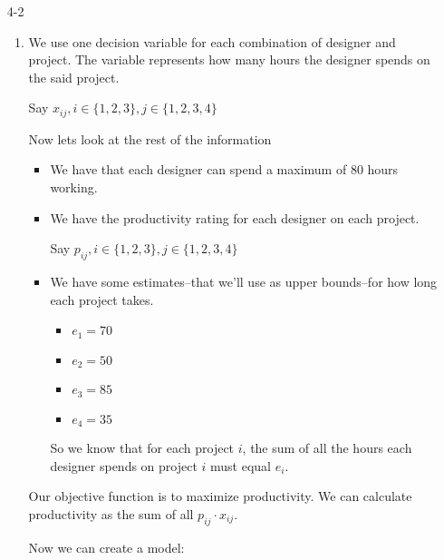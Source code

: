 \documentclass[12pt,letterpaper]{article}
\begin{document}
\begin{enumerate}
    \item [4-2]
      \begin{enumerate}
        \item
          We use one decision variable for each combination of designer and project.
          The variable represents how many hours the designer spends on the said project.

          Say $x_{ij}, i \in \{1, 2, 3\}, j \in \{1, 2, 3, 4\}$

          Now lets look at the rest of the information

          \begin{itemize}
            \item We have that each designer can spend a maximum of 80 hours working.
            \item
              We have the productivity rating for each designer on each project.

              Say $p_{ij}, i \in \{1, 2, 3\}, j \in \{1, 2, 3, 4\}$
            \item
              We have some estimates--that we'll use as upper bounds--for how long each project takes.
              \begin{itemize}
                \item $e_1 = 70$
                \item $e_2 = 50$
                \item $e_3 = 85$
                \item $e_4 = 35$
              \end{itemize}
              So we know that for each project $i$,
              the sum of all the hours each designer spends on project $i$ must equal $e_i$.
          \end{itemize}

          Our objective function is to maximize productivity.
          We can calculate productivity as the sum of all $p_{ij} \cdot x_{ij}$.

          Now we can create a model:


\end{enumerate}
\end{enumerate}
\end{document}
